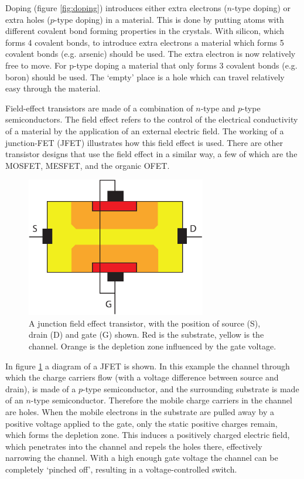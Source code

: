 Doping (figure \ref{fig:doping}) introduces either extra electrons ($n$-type doping) or extra holes ($p$-type doping) in a material. This is done by putting atoms with different covalent bond forming properties in the crystals. With silicon, which forms 4 covalent bonds, to introduce extra electrons a material which forms 5 covalent bonds (e.g. arsenic) should be used. The extra electron is now relatively free to move. For p-type doping a material that only forms 3 covalent bonds (e.g. boron) should be used. The `empty' place is a hole which can travel relatively easy through the material.

Field-effect transistors are made of a combination of $n$-type and $p$-type semiconductors. The field effect refers to the control of the electrical conductivity of a material by the application of an external electric field. The working of a junction-FET (JFET) illustrates how this field effect is used. There are other transistor designs that use the field effect in a similar way, a few of which are the MOSFET, MESFET, and the organic OFET.

\begin{figure}[!ht]
 \begin{center}
  \includegraphics[width=0.7\textwidth]{jfet}
  \caption{A junction field effect transistor, with the position of source (S), drain (D) and gate (G) shown. Red is the substrate, yellow is the channel. Orange is the depletion zone influenced by the gate voltage.}
  \label{fig:JFET}
 \end{center}
\end{figure}

In figure \ref{fig:JFET} a diagram of a JFET is shown. In this example the channel through which the charge carriers flow (with a voltage difference between source and drain), is made of a $p$-type semiconductor, and the surrounding substrate is made of an $n$-type semiconductor. Therefore the mobile charge carriers in the channel are holes. When the mobile electrons in the substrate are pulled away by a positive voltage applied to the gate, only the static positive charges remain, which forms the depletion zone. This induces a positively charged electric field, which penetrates into the channel and repels the holes there, effectively narrowing the channel. With a high enough gate voltage the channel can be completely `pinched off', resulting in a voltage-controlled switch.

